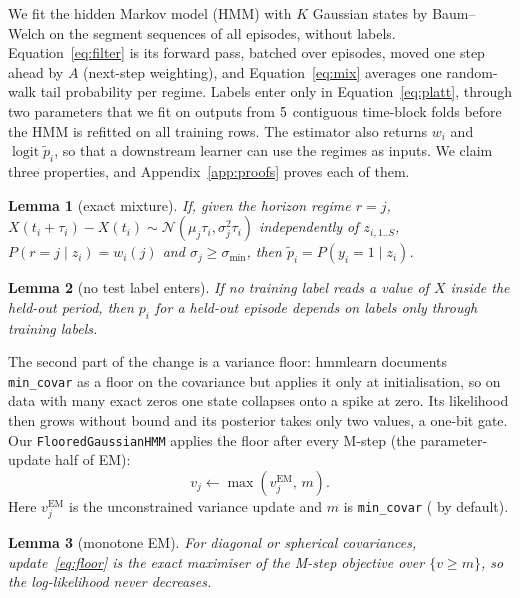 \documentclass{article}
\newtheorem{lemma}{Lemma}
\begin{document}
We fit the hidden Markov model (HMM) with $K$ Gaussian states by Baum--Welch \citep{baum1970} on the segment sequences of all episodes, without labels.
Equation~\eqref{eq:filter} is its forward pass, batched over episodes, moved one step ahead by $A$ (next-step weighting), and Equation~\eqref{eq:mix} averages one random-walk tail probability per regime.
Labels enter only in Equation~\eqref{eq:platt}, through two parameters that we fit on outputs from $5$ contiguous time-block folds before the HMM is refitted on all training rows.
The estimator also returns $w_i$ and $\operatorname{logit}\tilde p_i$, so that a downstream learner can use the regimes as inputs.
We claim three properties, and Appendix~\ref{app:proofs} proves each of them.

\begin{lemma}[exact mixture]
\label{lem:mix}
If, given the horizon regime $r=j$, $X(t_i+\tau_i)-X(t_i)\sim\mathcal N(\mu_j\tau_i,\sigma_j^2\tau_i)$ independently of $z_{i,1..S}$, $P(r=j\mid z_i)=w_i(j)$ and $\sigma_j\ge\sigma_{\min}$, then $\tilde p_i=P(y_i=1\mid z_i)$.
\end{lemma}

\begin{lemma}[no test label enters]
\label{lem:leak}
If no training label reads a value of $X$ inside the held-out period, then $p_i$ for a held-out episode depends on labels only through training labels.
\end{lemma}

The second part of the change is a variance floor: hmmlearn documents \texttt{min\_covar} as a floor on the covariance but applies it only at initialisation, so on data with many exact zeros one state collapses onto a spike at zero.
Its likelihood then grows without bound and its posterior takes only two values, a one-bit gate.
Our \texttt{FlooredGaussianHMM} applies the floor after every M-step (the parameter-update half of EM):
\begin{equation}
  v_j \leftarrow \max\!\left(v_j^{\mathrm{EM}},\,m\right).
  \label{eq:floor}
\end{equation}
Here $v_j^{\mathrm{EM}}$ is the unconstrained variance update and $m$ is \texttt{min\_covar} (\nCfgMinCovar{} by default).

\begin{lemma}[monotone EM]
\label{lem:floor}
For diagonal or spherical covariances, update~\eqref{eq:floor} is the exact maximiser of the M-step objective over $\{v\ge m\}$, so the log-likelihood never decreases.
\end{lemma}
\end{document}
